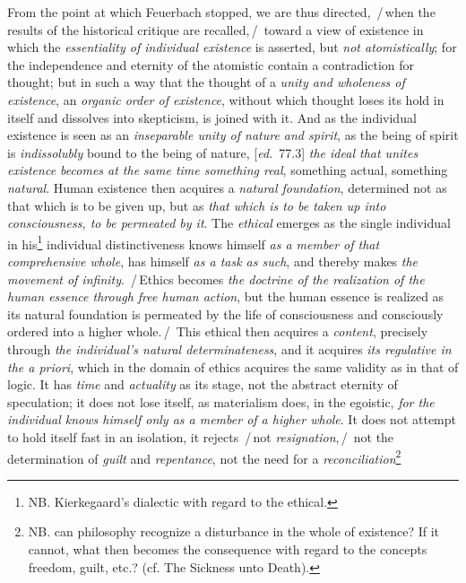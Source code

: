 \documentclass[12pt,a4paper,openany]{book}
\newcommand{\kpage}[1]{\marginnote{\footnotesize\textit{[#1]}}}
\newcommand{\ed}[1]{{\small[\textit{ed.}\ #1]}}
\newcommand{\ins}[1]{\,/\,#1\,/\,}
\begin{document}
From the point at which Feuerbach stopped, we are thus
directed, \ins{when the results of the historical critique are recalled,} toward a
view of existence in which the \emph{essentiality of individual existence}
is asserted, but \emph{not atomistically}; for the independence and eternity of the atomistic
contain a contradiction for thought; but in such a way that
the thought of a \emph{unity and wholeness of existence}, an \emph{organic order of existence},
without which thought loses its hold in itself and dissolves into skepticism\kpage{183},
is joined with it. And as the individual existence is seen as an \emph{inseparable
unity of nature and spirit}, as the being of spirit is \emph{indissolubly} bound to
the being of nature, \ed{77.3} \emph{the ideal that unites existence becomes at the same time
something real}, something actual, something \emph{natural}. Human existence then acquires
a \emph{natural foundation}, determined not as that which is to be given up, but as
\emph{that which is to be taken up into consciousness, to be permeated by it}. The \emph{ethical} emerges
as the single individual in his\footnote[144]{NB. Kierkegaard's dialectic with regard to the ethical.}
individual distinctiveness
knows himself \emph{as a member of that comprehensive whole}, has himself \emph{as a task as such},
and thereby makes \emph{the movement of infinity}. \ins{Ethics becomes \emph{the doctrine of the
realization of the human essence through free human action}, but the
human essence is realized as its natural foundation is permeated
by the life of consciousness and consciously ordered into a higher whole.}
This ethical then acquires a \emph{content}, precisely through \emph{the individual's natural determinateness},
and it acquires \emph{its regulative in the a priori}, which in the domain of ethics
acquires the same validity as in that of logic. It has \emph{time} and
\emph{actuality} as its stage, not the abstract eternity of speculation;
it does not lose itself, as materialism does, in the egoistic, \emph{for
the individual knows himself only as a member of a higher whole}. It does not attempt to
hold itself fast in an isolation, it rejects \ins{not \emph{resignation},} not
the determination of \emph{guilt} and \emph{repentance}, not the need for a \emph{reconciliation}\footnote[145]{NB. can philosophy recognize a disturbance in the whole of existence? If
it cannot, what then becomes the consequence with regard to the concepts freedom,
guilt, etc.? (cf. The Sickness unto Death).}
\end{document}
